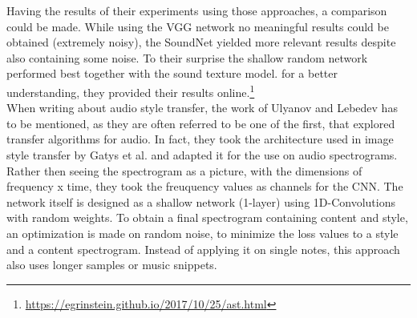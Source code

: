 Having the results of their experiments using those approaches, a comparison could be made. While using the VGG network no meaningful results could be obtained (extremely noisy), the SoundNet yielded more relevant results despite also containing some noise. To their surprise the shallow random network performed best together with the sound texture model. for a better understanding, they provided their results online.\footnote{\url{https://egrinstein.github.io/2017/10/25/ast.html}}\\

When writing about audio style transfer, the work of Ulyanov and Lebedev has to be mentioned, as they are often referred to be one of the first, that explored transfer algorithms for audio. \cite{ulyanov2016audio} In fact, they took the architecture used in image style transfer by Gatys et al. and adapted it for the use on audio spectrograms. Rather then seeing the spectrogram as a picture, with the dimensions of frequency x time, they took the freuquency values as channels for the CNN. The network itself is designed as a shallow network (1-layer) using 1D-Convolutions with random weights. To obtain a final spectrogram containing content and style, an optimization is made on random noise, to minimize the loss values to a style and a content spectrogram. Instead of applying it on single notes, this approach also uses longer samples or music snippets. 

